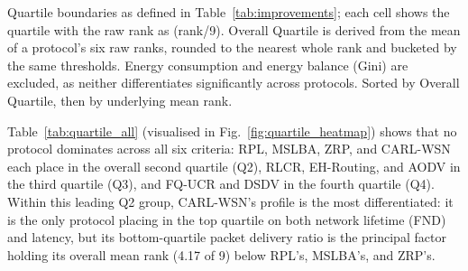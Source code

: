\documentclass[12pt]{article}
\begin{document}
\begin{table}[!t]
\renewcommand{\arraystretch}{1.2}
\caption{Quartile Standing of All Nine Protocols Across Six Statistically Differentiated Criteria --- Mixed Traffic}
\label{tab:quartile_all}
\centering
{}
\vspace{2pt}
{\footnotesize \raggedright Quartile boundaries as defined in Table~\ref{tab:improvements}; each cell shows the quartile with the raw rank as (rank/9). Overall Quartile is derived from the mean of a protocol's six raw ranks, rounded to the nearest whole rank and bucketed by the same thresholds. Energy consumption and energy balance (Gini) are excluded, as neither differentiates significantly across protocols. Sorted by Overall Quartile, then by underlying mean rank.\par}
\end{table}

Table~\ref{tab:quartile_all} (visualised in
Fig.~\ref{fig:quartile_heatmap}) shows that no protocol dominates
across all six criteria: RPL, MSLBA, ZRP, and CARL-WSN each place in
the overall second quartile (Q2), RLCR, EH-Routing, and AODV in the
third quartile (Q3), and FQ-UCR and DSDV in the fourth quartile (Q4).
Within this leading Q2 group, CARL-WSN's profile is the most
differentiated: it is the only protocol placing in the top quartile
on both network lifetime (FND) and latency, but its bottom-quartile
packet delivery ratio is the principal factor holding its overall
mean rank (4.17 of 9) below RPL's, MSLBA's, and ZRP's.
\end{document}
